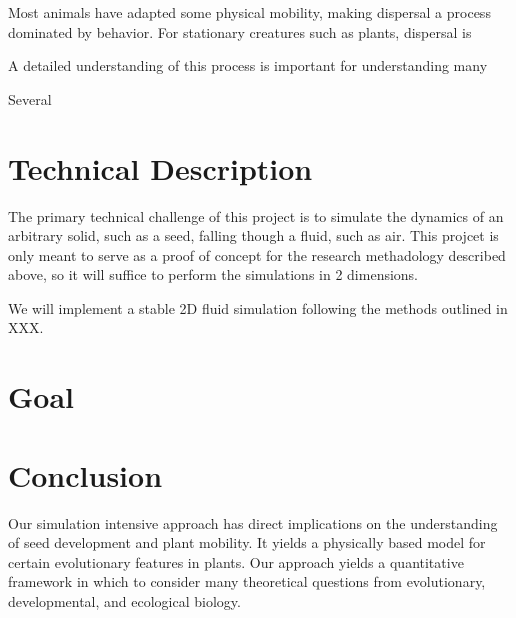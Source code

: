 \documentclass[annual]{acmsiggraph}
\begin{document}
 

Most animals have adapted some physical mobility, making dispersal a process dominated by behavior.  For stationary creatures such as plants, dispersal is  


A detailed understanding of this process is important for understanding many 



\cite{wang2012}
\cite{levin1989}

Several 



\section{Technical Description}
The primary technical challenge of this project is to simulate the dynamics of an arbitrary solid, such as a seed, falling though a fluid, such as air.  This projcet is only meant to serve as a proof of concept for the research methadology described above, so it will suffice to perform the simulations in 2 dimensions.   

We will implement a stable 2D fluid simulation following the methods outlined in XXX.   



\section{Goal}

\section{Conclusion}

Our simulation intensive approach has direct implications on the understanding of seed development and plant mobility.  It yields a physically based model for certain evolutionary features in plants.   Our approach yields a quantitative framework in which to consider many theoretical questions from evolutionary, developmental, and ecological biology.  




\end{document}
